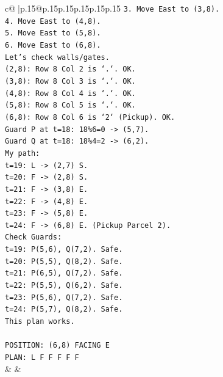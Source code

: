 \documentclass{article}
\begin{document}
{\begin{supertabular}{c@{$\;$}|p{.15\linewidth}@{}p{.15\linewidth}p{.15\linewidth}p{.15\linewidth}p{.15\linewidth}p{.15\linewidth}}
{{{\texttt{3. Move East to (3,8).} \\
\texttt{4. Move East to (4,8).} \\
\texttt{5. Move East to (5,8).} \\
\texttt{6. Move East to (6,8).} \\
\texttt{Let's check walls/gates.} \\
\texttt{(2,8): Row 8 Col 2 is `.`. OK.} \\
\texttt{(3,8): Row 8 Col 3 is `.`. OK.} \\
\texttt{(4,8): Row 8 Col 4 is `.`. OK.} \\
\texttt{(5,8): Row 8 Col 5 is `.`. OK.} \\
\texttt{(6,8): Row 8 Col 6 is `2` (Pickup). OK.} \\
\texttt{Guard P at t=18: 18\%6=0 {-}> (5,7).} \\
\texttt{Guard Q at t=18: 18\%4=2 {-}> (6,2).} \\
\texttt{My path:} \\
\texttt{t=19: L {-}> (2,7) S.} \\
\texttt{t=20: F {-}> (2,8) S.} \\
\texttt{t=21: F {-}> (3,8) E.} \\
\texttt{t=22: F {-}> (4,8) E.} \\
\texttt{t=23: F {-}> (5,8) E.} \\
\texttt{t=24: F {-}> (6,8) E. (Pickup Parcel 2).} \\
\texttt{Check Guards:} \\
\texttt{t=19: P(5,6), Q(7,2). Safe.} \\
\texttt{t=20: P(5,5), Q(8,2). Safe.} \\
\texttt{t=21: P(6,5), Q(7,2). Safe.} \\
\texttt{t=22: P(5,5), Q(6,2). Safe.} \\
\texttt{t=23: P(5,6), Q(7,2). Safe.} \\
\texttt{t=24: P(5,7), Q(8,2). Safe.} \\
\texttt{This plan works.} \\
\\ 
\texttt{POSITION: (6,8) FACING E} \\
\texttt{PLAN: L F F F F F} \\
            }
        }
    }
    & & \\ \\


\end{supertabular}}
\end{document}
